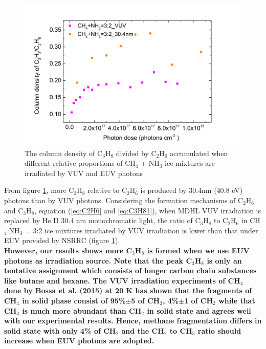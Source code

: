 \begin{figure}
\centering
\includegraphics[width=\textwidth]{figures/chapter3/VUV_EUV_C3H8_C2H6.png}
\caption{The column density of C$_3$H$_8$ divided by C$_2$H$_6$ accumulated when different relative proportions of CH$_4$ + NH$_3$ ice mixtures are irradiated by VUV and EUV photons}
\label{fig:NSRRC_Lab_C3H8_C2H6}
\end{figure}


From figure \ref{fig:NSRRC_Lab_C3H8_C2H6}, more C$_3$H$_8$ relative to C$_2$H$_6$ is produced by 30.4nm (40.8 eV) photons than by VUV photons. Considering the formation mechanisms of C$_2$H$_6$ and C$_3$H$_8$, equation (\ref{eq:C2H6} and \ref{eq:C3H81}), when MDHL VUV irradiation is replaced by He II 30.4 nm monochromatic light, the ratio of C$_3$H$_8$ to C$_2$H$_6$ in CH$_4$:NH$_3$ = 3:2 ice mixtures irradiated by VUV irradiation is lower than that under EUV provided by NSRRC (figure \ref{fig:NSRRC_Lab_C3H8_C2H6}).\\

\textbf{However, our results shows more C$_3$H$_8$ is formed when we use EUV photons as irradiation source. Note that the peak C$_3$H$_8$ is only an tentative assignment which consists of longer carbon chain substances like butane and hexane. The VUV irradiation experiments of CH$_4$ done by Bossa et al. (2015)\cite{bossa2015methane} at 20 K has shown that the fragments of CH$_4$ in solid phase consist of 95\%$\pm$5 of CH$_3$, 4\%$\pm$1 of CH$_2$ while that CH$_3$ is much more abundant than CH$_2$ in solid state and agrees well with our experimental results. Hence, methane fragmentation differs in solid state with only 4\% of CH$_2$ and the CH$_2$ to CH$_3$ ratio should increase when EUV photons are adopted.} \\


